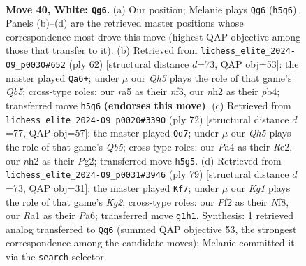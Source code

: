 \documentclass[11pt]{article}
\begin{document}
\clearpage

\begin{figure}[p]\centering
\begin{subfigure}{0.46\textwidth}\centering
\resizebox{\linewidth}{!}{%
\newchessgame
\chessboard[
  setfen={2r3k1/3n2p1/1p6/r2p3Q/P3p2N/7q/2P2P1n/R2R2K1 w - - 2 40},
  showmover=false,
  pgfstyle=straightmove, color=movearrow, markmove={h5-g6}
]}
\caption{}
\end{subfigure}\hfill
\begin{subfigure}{0.46\textwidth}\centering
\resizebox{\linewidth}{!}{%
\newchessgame
\chessboard[
  setfen={2kr1b2/p4p2/5P2/1QNq4/1p1p4/1Pp2nP1/5P2/R2R3K w - - 8 32},
  showmover=false,
  pgfstyle=straightmove, color=movearrow, markmove={b5-a6}
]}
\caption{}
\end{subfigure}
\\[4pt]
\begin{subfigure}{0.46\textwidth}\centering
\resizebox{\linewidth}{!}{%
\newchessgame
\chessboard[
  setfen={qr6/1Np2nk1/P3r1p1/1Q2p2p/P7/7P/4R1P1/4R1K1 w - - 3 37},
  showmover=false,
  pgfstyle=straightmove, color=movearrow, markmove={b5-d7}
]}
\caption{}
\end{subfigure}\hfill
\begin{subfigure}{0.46\textwidth}\centering
\resizebox{\linewidth}{!}{%
\newchessgame
\chessboard[
  setfen={1q1r1n2/6k1/p1P2Np1/3P4/3B1P1r/6R1/P5Qp/3R3K b - - 2 40},
  showmover=false,
  pgfstyle=straightmove, color=movearrow, markmove={g7-f7}
]}
\caption{}
\end{subfigure}
\caption{\textbf{Move 40, White: \texttt{Qg6}.} (a) Our position; Melanie plays \texttt{Qg6} (\texttt{h5g6}). Panels (b)--(d) are the retrieved master positions whose correspondence most drove this move (highest QAP objective among those that transfer to it). (b) Retrieved from \texttt{lichess\_elite\_2024-09\_p0030\#652} (ply 62) [structural distance $d$=73, QAP obj=53]: the master played \texttt{Qa6+}; under $\mu$ our \emph{Qh5} plays the role of that game's \emph{Qb5}; cross-type roles: our \emph{r}a5 as their \emph{n}f3, our \emph{n}h2 as their \emph{p}b4; transferred move \texttt{h5g6} \textbf{(endorses this move)}. (c) Retrieved from \texttt{lichess\_elite\_2024-09\_p0020\#3390} (ply 72) [structural distance $d$=77, QAP obj=57]: the master played \texttt{Qd7}; under $\mu$ our \emph{Qh5} plays the role of that game's \emph{Qb5}; cross-type roles: our \emph{P}a4 as their \emph{R}e2, our \emph{n}h2 as their \emph{P}g2; transferred move \texttt{h5g5}. (d) Retrieved from \texttt{lichess\_elite\_2024-09\_p0031\#3946} (ply 79) [structural distance $d$=73, QAP obj=31]: the master played \texttt{Kf7}; under $\mu$ our \emph{Kg1} plays the role of that game's \emph{Kg2}; cross-type roles: our \emph{P}f2 as their \emph{N}f8, our \emph{R}a1 as their \emph{P}a6; transferred move \texttt{g1h1}. Synthesis: 1 retrieved analog transferred to \texttt{Qg6} (summed QAP objective 53, the strongest correspondence among the candidate moves); Melanie committed it via the \texttt{search} selector.}
\label{fig:thought-m78}
\end{figure}
\end{document}
